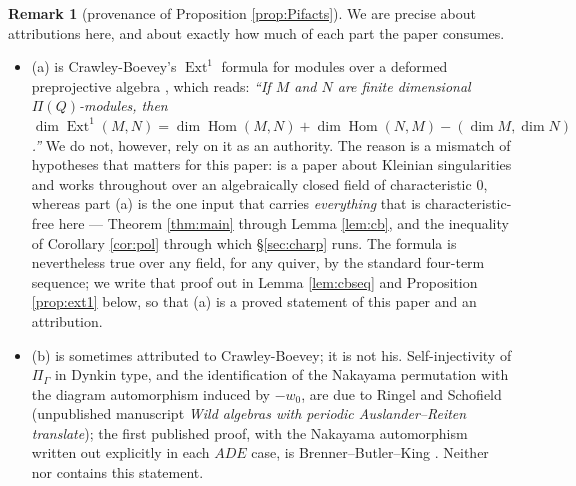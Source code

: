 \documentclass[reqno]{amsart}
\theoremstyle{plain}
\theoremstyle{definition}
\newtheorem{remark}[theorem]{Remark}
\DeclareMathOperator{\Hom}{Hom}
\DeclareMathOperator{\Ext}{Ext}
\newcommand{\Pia}{\Pi}
\begin{document}
\begin{remark}[provenance of Proposition \ref{prop:Pifacts}]\label{rem:Pifacts}
We are precise about attributions here, and about exactly how much of each
part the paper consumes.
\begin{itemize}\itemsep1pt
\item \textup{(a)} is Crawley-Boevey's $\Ext^1$ formula for modules over a
deformed preprojective algebra \cite[Lem.~1]{CB}, which reads: \emph{``If $M$
and $N$ are finite dimensional $\Pi(Q)$-modules, then
$\dim\Ext^1(M,N)=\dim\Hom(M,N)+\dim\Hom(N,M)-(\dim M,\dim N)$.''}  We do not,
however, rely on it as an authority.  The reason is a mismatch of hypotheses that matters for
this paper: \cite{CB} is a paper about Kleinian singularities and works
throughout over an algebraically closed field of characteristic $0$, whereas
part \textup{(a)} is the one input that carries \emph{everything} that is
characteristic-free here --- Theorem \ref{thm:main} through Lemma
\ref{lem:cb}, and the inequality of Corollary \ref{cor:pol} through which
\S\ref{sec:charp} runs.  The formula is nevertheless true over any field, for
any quiver, by the standard four-term sequence; we write that proof out in
Lemma \ref{lem:cbseq} and Proposition \ref{prop:ext1} below, so that
\textup{(a)} is a proved statement of this paper and \cite{CB} an attribution.
\item \textup{(b)} is sometimes attributed to Crawley-Boevey; it is not his.
Self-injectivity of $\Pia_\Gamma$ in Dynkin type, and the
identification of the Nakayama permutation with the diagram automorphism
induced by $-w_0$, are due to Ringel and Schofield (unpublished manuscript
\emph{Wild algebras with periodic Auslander--Reiten translate}); the first
published proof, with the Nakayama automorphism written out explicitly in each
$ADE$ case, is Brenner--Butler--King \cite{BBK}.  Neither
\cite[\S2]{BK} nor \cite{GLS} contains this statement.
\end{itemize}


\end{remark}
\end{document}
